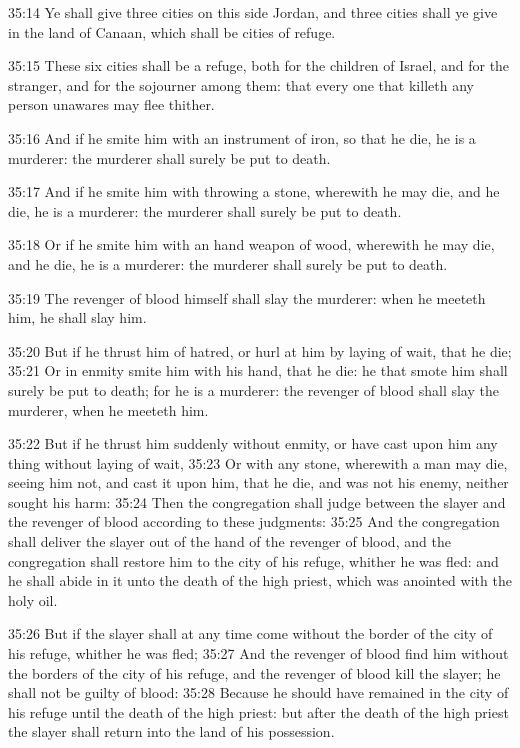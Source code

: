 35:14 Ye shall give three cities on this side Jordan, and three cities
shall ye give in the land of Canaan, which shall be cities of refuge.

35:15 These six cities shall be a refuge, both for the children of
Israel, and for the stranger, and for the sojourner among them: that
every one that killeth any person unawares may flee thither.

35:16 And if he smite him with an instrument of iron, so that he die,
he is a murderer: the murderer shall surely be put to death.

35:17 And if he smite him with throwing a stone, wherewith he may die,
and he die, he is a murderer: the murderer shall surely be put to
death.

35:18 Or if he smite him with an hand weapon of wood, wherewith he may
die, and he die, he is a murderer: the murderer shall surely be put to
death.

35:19 The revenger of blood himself shall slay the murderer: when he
meeteth him, he shall slay him.

35:20 But if he thrust him of hatred, or hurl at him by laying of
wait, that he die; 35:21 Or in enmity smite him with his hand, that he
die: he that smote him shall surely be put to death; for he is a
murderer: the revenger of blood shall slay the murderer, when he
meeteth him.

35:22 But if he thrust him suddenly without enmity, or have cast upon
him any thing without laying of wait, 35:23 Or with any stone,
wherewith a man may die, seeing him not, and cast it upon him, that he
die, and was not his enemy, neither sought his harm: 35:24 Then the
congregation shall judge between the slayer and the revenger of blood
according to these judgments: 35:25 And the congregation shall deliver
the slayer out of the hand of the revenger of blood, and the
congregation shall restore him to the city of his refuge, whither he
was fled: and he shall abide in it unto the death of the high priest,
which was anointed with the holy oil.

35:26 But if the slayer shall at any time come without the border of
the city of his refuge, whither he was fled; 35:27 And the revenger of
blood find him without the borders of the city of his refuge, and the
revenger of blood kill the slayer; he shall not be guilty of blood:
35:28 Because he should have remained in the city of his refuge until
the death of the high priest: but after the death of the high priest
the slayer shall return into the land of his possession.

